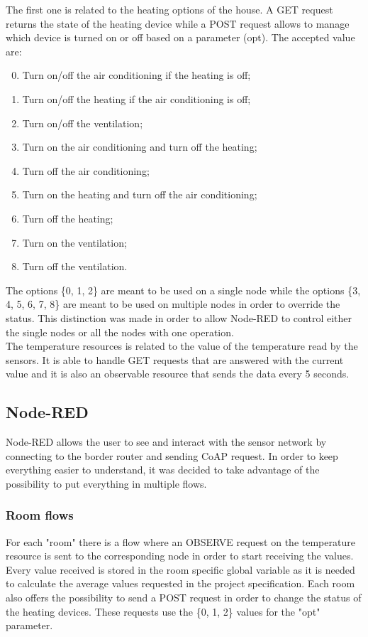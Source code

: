 The first one is related to the heating options of the house. A GET request returns the state of the heating device while a POST request allows to manage which device is turned on or off based on a parameter (opt). The accepted value are:
\begin{enumerate}
\setcounter{enumi}{-1}
	\item Turn on/off the air conditioning if the heating is off;
	\item Turn on/off the heating if the air conditioning is off;
	\item Turn on/off the ventilation;
	\item Turn on the air conditioning and turn off the heating;
	\item Turn off the air conditioning;
	\item Turn on the heating and turn off the air conditioning;
	\item Turn off the heating;
	\item Turn on the ventilation;
	\item Turn off the ventilation.
\end{enumerate}
The options \{0, 1, 2\} are meant to be used on a single node while the options \{3, 4, 5, 6, 7, 8\} are meant to be used on multiple nodes in order to override the status. This distinction was made in order to allow Node-RED to control either the single nodes or all the nodes with one operation.\\
The temperature resources is related to the value of the temperature read by the sensors. It is able to handle GET requests that are answered with the current value and it is also an observable resource that sends the data every 5 seconds.

\subsection*{Node-RED}
Node-RED allows the user to see and interact with the sensor network by connecting to the border router and sending CoAP request. In order to keep everything easier to understand, it was decided to take advantage of the possibility to put everything in multiple flows.
\subsubsection*{Room flows}
For each "room" there is a flow where an OBSERVE request on the temperature resource is sent to the corresponding node in order to start receiving the values. Every value received is  stored in the room specific global variable as it is needed to calculate the average values requested in the project specification. Each room also offers the possibility to  send a POST request in order to change the status of the heating devices. These requests use the \{0, 1, 2\} values for the "opt" parameter.
